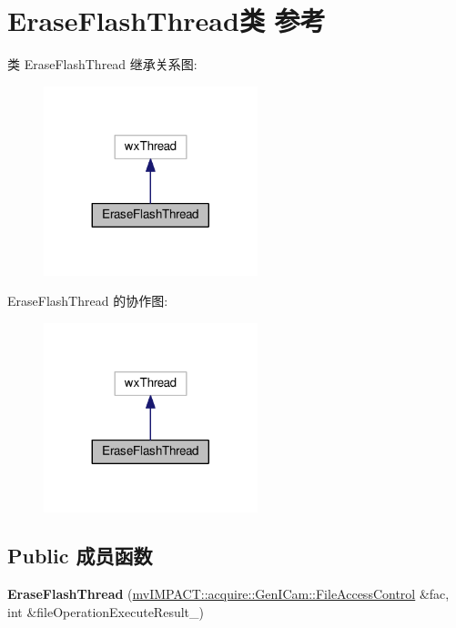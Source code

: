 \hypertarget{class_erase_flash_thread}{\section{Erase\+Flash\+Thread类 参考}
\label{class_erase_flash_thread}
}


类 Erase\+Flash\+Thread 继承关系图\+:
\nopagebreak
\begin{figure}[H]
\begin{center}
\leavevmode
\includegraphics[width=176pt]{class_erase_flash_thread__inherit__graph}
\end{center}
\end{figure}


Erase\+Flash\+Thread 的协作图\+:
\nopagebreak
\begin{figure}[H]
\begin{center}
\leavevmode
\includegraphics[width=176pt]{class_erase_flash_thread__coll__graph}
\end{center}
\end{figure}
\subsection*{Public 成员函数}
\begin{DoxyCompactItemize}
\item 
\hypertarget{class_erase_flash_thread_a22299796e94a30975f0405cf70883d74}{{\bfseries Erase\+Flash\+Thread} (\hyperlink{classmv_i_m_p_a_c_t_1_1acquire_1_1_gen_i_cam_1_1_file_access_control}{mv\+I\+M\+P\+A\+C\+T\+::acquire\+::\+Gen\+I\+Cam\+::\+File\+Access\+Control} \&fac, int \&file\+Operation\+Execute\+Result\+\_\+)}\label{class_erase_flash_thread_a22299796e94a30975f0405cf70883d74}

\end{DoxyCompactItemize}
